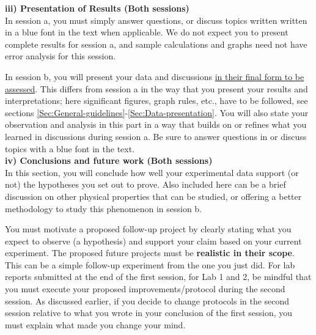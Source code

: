 \documentclass[12pt]{report}
\begin{document}
\noindent \textbf{iii) Presentation of Results (Both sessions)}\\
In session a, you must simply answer questions, or discuss topics written written in a blue font in the text when applicable. We do not expect you to present complete results for  session a, and sample calculations and graphs need not have error analysis for this session. 

In session b, you will present your data and discussions \underline{in their final form to be assessed}. This differs from session a in the way that you present your results and interpretations; here significant figures, graph rules, etc., have to be followed, see sections \ref{Sec:General-guidelines}-\ref{Sec:Data-presentation}. 
You will also state your observation and analysis in this part in a way that builds on or refines what you learned in discussions during session a. {\color{blue} Be sure to answer questions in or discuss topics with a blue font in the text.}  \\

\noindent \textbf{iv) Conclusions and future work (Both sessions) }\\
\noindent In this section, you will conclude how well your experimental data support (or not) the hypotheses you set out to prove. Also included here can be a brief discussion on other physical properties that can be studied, or offering a better methodology to study this phenomenon in session b.

You must motivate a proposed follow-up project by clearly stating what you expect to observe (a hypothesis) and support your claim based on your current experiment. The proposed future projects must be \textbf{realistic in their scope}.
This can be a simple follow-up experiment from the one you just did. 
For lab reports submitted at the end of the first session, for Lab 1 and 2, be mindful that you must execute your proposed improvements/protocol during the second session.
As discussed earlier, if you decide to change protocols in the second session relative to what you wrote in your conclusion of the first session, you must explain what made you change your mind. 
\end{document}
